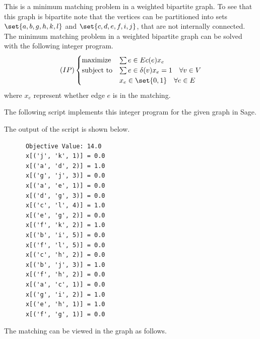 \documentclass[11pt, oneside]{article}
\begin{document}
\begin{enumerate}
    This is a minimum matching problem in a weighted bipartite graph.
    To see that this graph is bipartite note that the vertices can be
    partitioned into sets $\set{a, b, g, h, k, l}$ and
    $\set{c, d, e, f, i, j}$, that are not internally connected.
    The minimum matching problem in a weighted bipartite graph can be solved
    with the following integer program.
    \[
      (IP)
      \begin{cases}
        \text{maximize} & \sum{e \in E}{}{c(e)x_e} \\
        \text{subject to} & \sum{e \in \delta(v)}{}{x_e} = 1 \quad \forall v \in V \\
                          & x_e \in \set{0, 1} \quad \forall e \in E
      \end{cases}
    \]
    where $x_e$ represent whether edge $e$ is in the matching.

    The following script implements this integer program for the given graph
    in Sage.
    
    The output of the script is shown below.
    \begin{verbatim}
      Objective Value: 14.0
      x[('j', 'k', 1)] = 0.0
      x[('a', 'd', 2)] = 1.0
      x[('g', 'j', 3)] = 0.0
      x[('a', 'e', 1)] = 0.0
      x[('d', 'g', 3)] = 0.0
      x[('c', 'l', 4)] = 1.0
      x[('e', 'g', 2)] = 0.0
      x[('f', 'k', 2)] = 1.0
      x[('b', 'i', 5)] = 0.0
      x[('f', 'l', 5)] = 0.0
      x[('c', 'h', 2)] = 0.0
      x[('b', 'j', 3)] = 1.0
      x[('f', 'h', 2)] = 0.0
      x[('a', 'c', 1)] = 0.0
      x[('g', 'i', 2)] = 1.0
      x[('e', 'h', 1)] = 1.0
      x[('f', 'g', 1)] = 0.0
    \end{verbatim}
    The matching can be viewed in the graph as follows.
    \begin{center}
    \end{center}


\end{enumerate}
\end{document}
